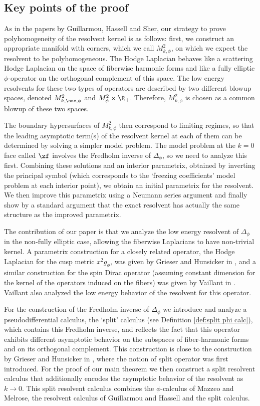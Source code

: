 \subsection{Key points of the proof}
As in the papers by Guillarmou, Hassell and Sher, our strategy to prove polyhomogeneity of the resolvent kernel is as follows: first, we construct an appropriate manifold with corners, which we call $M^2_{k,\phi}$, on which we expect the resolvent to be polyhomogeneous. The Hodge Laplacian behaves like a scattering Hodge Laplacian on the space of fiberwise harmonic forms and like a fully elliptic $\phi$-operator on the orthogonal complement of this space. The low energy resolvents for these two types of operators are described by two different blowup spaces, denoted $M^2_{k,\ssc,\phi}$ and $M^2_\phi\times\R_+$. Therefore, $M^2_{k,\phi}$ is chosen as a common blowup of these two spaces.

The boundary hypersurfaces of $M^2_{k,\phi}$ then correspond to limiting regimes, so that the leading asymptotic term(s) of the resolvent kernel at each of them can be determined by solving a simpler model problem. The model problem at the $k=0$ face called $\zf$ involves the Fredholm inverse of $\Delta_\phi$, so we need to analyze this first.
Combining these solutions and an interior parametrix, obtained by inverting the principal symbol (which corresponds to the `freezing coefficients' model problem at each interior point), we obtain an initial parametrix for the resolvent. We then improve this parametrix using a Neumann series argument and finally show by a standard argument that the exact resolvent has actually the same structure as the improved parametrix.

The contribution of our paper is that we analyze the low energy resolvent of $\Delta_{\phi}$ in the non-fully elliptic case, \ie allowing the fiberwise Laplacians to have non-trivial kernel. A parametrix construction for a closely related operator, the Hodge Laplacian for the cusp metric $x^2g_\phi$, was given by Grieser and Hunsicker in \cite{grieser-para}, and a similar construction for the spin Dirac operator (assuming constant dimension for the kernel of the operators induced on the fibers) was given by Vaillant in \cite{vaillant}. Vaillant also analyzed the low energy behavior of the resolvent for this operator.

For the construction of the Fredholm inverse of $\Delta_\phi$ we introduce and analyze a pseudodifferential calculus, the `split' calculus (see Definition \ref{def:split phi calc}), which contains this Fredholm inverse, and reflects the fact that this operator exhibits different asymptotic behavior on the subspaces of fiber-harmonic forms and on its orthogonal complement. This construction is close to the construction by Grieser and Hunsicker in \cite{grieser-para}, where the notion of split operator was first introduced.
For the proof of our main theorem we then construct a split resolvent calculus that additionally encodes the asymptotic behavior of the resolvent as $k\to0$. This split resolvent calculus combines the $\phi$-calculus of Mazzeo and Melrose, the resolvent calculus of Guillarmou and Hassell and the
split calculus.

